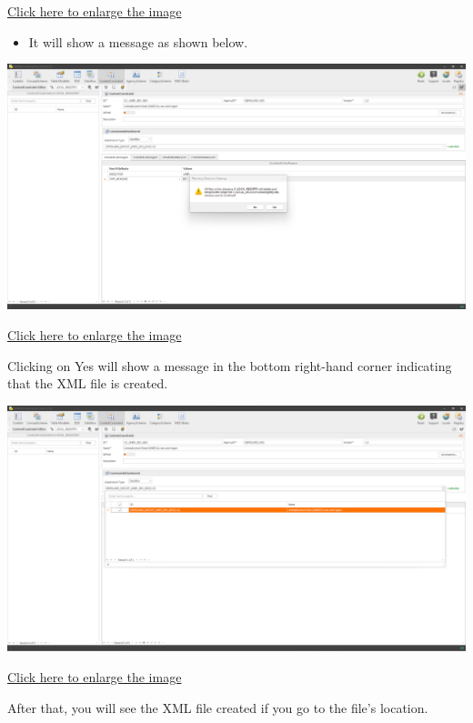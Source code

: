 \documentclass[
]{book}
\providecommand{\tightlist}{%
  \setlength{\itemsep}{0pt}\setlength{\parskip}{0pt}}
\begin{document}
\href{images/image276.png}{Click here to enlarge the image}

\begin{itemize}
\tightlist
\item
  It will show a message as shown below.
\end{itemize}

\begin{center}\includegraphics[width=1\linewidth]{./images/image277} \end{center}

\href{images/image277.png}{Click here to enlarge the image}

Clicking on Yes will show a message in the bottom right-hand corner indicating that the XML file is created.

\begin{center}\includegraphics[width=1\linewidth]{./images/image278} \end{center}

\href{images/image278.png}{Click here to enlarge the image}

After that, you will see the XML file created if you go to the file's location.
\end{document}
